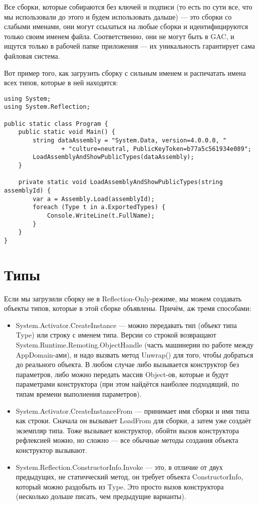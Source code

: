 \documentclass{../../text-style}
\begin{document}
Все сборки, которые собираются без ключей и подписи (то есть по сути все, что мы использовали до этого и будем использовать дальше) --- это сборки со слабыми именами, они могут ссылаться на любые сборки и идентифицируются только своим именем файла. Соответственно, они не могут быть в GAC, и ищутся только в рабочей папке приложения --- их уникальность гарантирует сама файловая система.

Вот пример того, как загрузить сборку с сильным именем и распечатать имена всех типов, которые в ней находятся:

\begin{verbatim}
using System;
using System.Reflection;

public static class Program {
    public static void Main() {
        string dataAssembly = "System.Data, version=4.0.0.0, "
                + "culture=neutral, PublicKeyToken=b77a5c561934e089";
        LoadAssemblyAndShowPublicTypes(dataAssembly);
    }

    private static void LoadAssemblyAndShowPublicTypes(string assemblyId) {
        var a = Assembly.Load(assemblyId);
        foreach (Type t in a.ExportedTypes) {
            Console.WriteLine(t.FullName);
        }
    }
}
\end{verbatim}

\section{Типы}

Если мы загрузили сборку не в Reflection-Only-режиме, мы можем создавать объекты типов, которые в этой сборке объявлены. Причём, аж тремя способами:

\begin{itemize}
    \item System.Activator.CreateInstance --- можно передавать тип (объект типа Type) или строку с именем типа. Версии со строкой возвращают System.Runtime.Remoting.ObjectHandle (часть машинерии по работе между AppDomain-ами), и надо вызвать метод Unwrap() для того, чтобы добраться до реального объекта. В любом случае либо вызывается конструктор без параметров, либо можно передать массив Object-ов, которые и будут параметрами конструктора (при этом найдётся наиболее подходящий, по типам времени выполнения параметров).
    \item System.Activator.CreateInstanceFrom --- принимает имя сборки и имя типа как строки. Сначала он вызывает LoadFrom для сборки, а затем уже создаёт экземпляр типа. Тоже вызывает конструктор, обойти вызов конструктора рефлексией можно, но сложно --- все обычные методы создания объекта конструктор вызывают.
    \item System.Reflection.ConstructorInfo.Invoke --- это, в отличие от двух предыдущих, не статичческий метод, он требует объекта ConstructorInfo, который можно раздобыть из Type. Это просто вызов конструктора (несколько дольше писать, чем предыдущие варианты).
\end{itemize}
\end{document}
